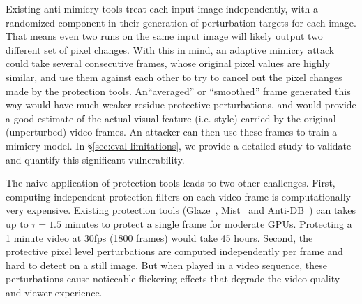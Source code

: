 Existing anti-mimicry tools treat each input image independently, with a
randomized component in their generation of perturbation targets for each
image. That means even two runs on the same input image will likely output
two different set of pixel changes. With this in mind, an adaptive mimicry
attack could take several consecutive frames, whose original pixel values are
highly similar, and use them against each other to try to cancel out the
pixel changes made by the protection tools.  An``averaged'' or
``smoothed'' frame generated this way would have much weaker residue
protective perturbations, and would provide a good estimate of the
actual visual feature (i.e. style) carried by the original (unperturbed)
video frames.  An attacker can then use these frames to train a
mimicry model. In \S\ref{sec:eval-limitations}, we provide a detailed study to
validate and quantify this significant vulnerability.


 The
naive application of protection tools leads to two other challenges. First,
computing independent protection filters on each video frame is
computationally very expensive.  Existing protection tools
(Glaze~\cite{shan2023glaze}, Mist~\cite{mist} and Anti-DB~\cite{antidb}) can
takes up to $\tau=1.5$ minutes to protect a single frame for moderate
GPUs. Protecting a 1 minute video at 30fps (1800 frames) would take 45 hours.
Second, the protective pixel level perturbations are computed independently per
frame and hard to detect on a still image. But when played in a video
sequence, these perturbations cause noticeable flickering effects that
degrade the video quality and viewer experience.
